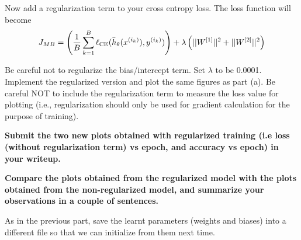 \item {} Now add a regularization term to your cross entropy loss.
The loss function will become \begin{equation*}
  J_{MB} = \left(\frac{1}{B}\sum_{k=1}^B \ell_\textup{CE}(\bar{h}_{\theta}(x^{(i_k)}),y^{(i_k)})\right)
 + \lambda \left(||W^{[1]}||^2 + ||W^{[2]}||^2 \right)
  \end{equation*}

Be careful not to regularize the bias/intercept term.
Set $\lambda$ to be 0.0001. Implement the regularized version and plot the same
figures as part (a). Be careful NOT to include the regularization term to measure
the loss value for plotting (i.e., regularization should only be used for gradient calculation for
the purpose of training).

\textbf{Submit the two new plots obtained with regularized training (i.e loss (without regularization term) vs epoch, and accuracy vs epoch) in your writeup.}

\textbf{Compare the plots obtained from the regularized model with the plots obtained
from the non-regularized model, and summarize your observations in a couple of sentences.}

As in the previous part, save the learnt parameters (weights and biases) into a
different file so that we can initialize from them next time.

